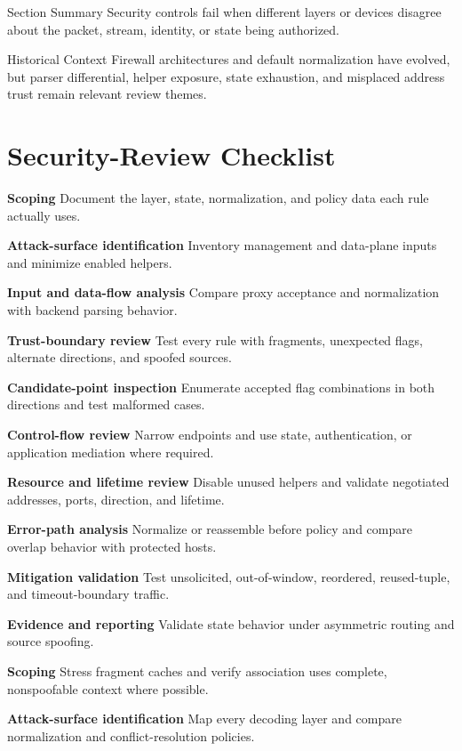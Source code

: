 \documentclass[11pt,letterpaper]{article}
\begin{document}
\begin{CornellSummaryBox}{Section Summary}
Security controls fail when different layers or devices disagree about the packet, stream, identity, or state being authorized.
\end{CornellSummaryBox}
\begin{CornellLegacyBox}{Historical Context}
Firewall architectures and default normalization have evolved, but parser differential, helper exposure, state exhaustion, and misplaced address trust remain relevant review themes.
\end{CornellLegacyBox}
\section{Security-Review Checklist}
\begin{CornellChecklist}
\item \textbf{Scoping}
Document the layer, state, normalization, and policy data each rule actually uses.
\item \textbf{Attack-surface identification}
Inventory management and data-plane inputs and minimize enabled helpers.
\item \textbf{Input and data-flow analysis}
Compare proxy acceptance and normalization with backend parsing behavior.
\item \textbf{Trust-boundary review}
Test every rule with fragments, unexpected flags, alternate directions, and spoofed sources.
\item \textbf{Candidate-point inspection}
Enumerate accepted flag combinations in both directions and test malformed cases.
\item \textbf{Control-flow review}
Narrow endpoints and use state, authentication, or application mediation where required.
\item \textbf{Resource and lifetime review}
Disable unused helpers and validate negotiated addresses, ports, direction, and lifetime.
\item \textbf{Error-path analysis}
Normalize or reassemble before policy and compare overlap behavior with protected hosts.
\item \textbf{Mitigation validation}
Test unsolicited, out-of-window, reordered, reused-tuple, and timeout-boundary traffic.
\item \textbf{Evidence and reporting}
Validate state behavior under asymmetric routing and source spoofing.
\item \textbf{Scoping}
Stress fragment caches and verify association uses complete, nonspoofable context where possible.
\item \textbf{Attack-surface identification}
Map every decoding layer and compare normalization and conflict-resolution policies.
\end{CornellChecklist}
\end{document}
